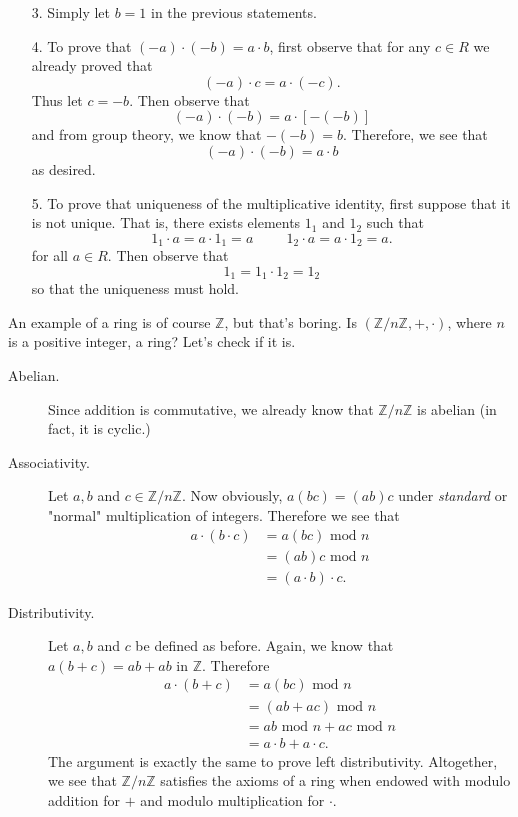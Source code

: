\documentclass[12pt,letterpaper]{algebra_book}
\newcommand{\ZZ}{\mathbb{Z}}
\theoremstyle{definition}
\begin{document}
\begin{prf}
\begin{itemize}
        \item[3.] Simply let $b = 1$ in the previous statements. 
        \item[4.] To prove that $(-a) \cdot (-b) = a \cdot b$,
        first observe that for any $c \in  R$ we already proved
        that 
        \[
            (-a) \cdot c = a \cdot (-c).
        \]
        Thus let $c = -b$. Then observe that 
        \[
            (-a) \cdot (-b) = a \cdot [-(-b)]
        \]
        and from group theory, we know that $-(-b) = b$.
        Therefore, we see that 
        \[
            (-a) \cdot (-b) = a \cdot b
        \]
        as desired. 

        \item[5.] To prove that uniqueness of the multiplicative
        identity, first suppose that it is not unique. That is,
        there exists elements $1_1$ and $1_2$ such that 
        \[
            1_1 \cdot a = a \cdot 1_1 = a \hspace{1cm}   1_2 \cdot a = a \cdot 1_2 = a.
        \]
        for all $a \in R$. Then observe that 
        \[
            1_1 = 1_1 \cdot 1_2 = 1_2
        \]
        so that the uniqueness must hold.
        
            
    \end{itemize}
\end{prf}
\textcolor{NavyBlue}{An example of a ring is of course $\mathbb{Z}$, but that's boring. 
Is $(\mathbb{Z}/n\mathbb{Z}, + , \cdot)$, where $n$ is a positive
integer, a ring? Let's check if it is. }
\begin{description}
    \item[Abelian.] Since addition is commutative, we already know
    that $\mathbb{Z}/n\mathbb{Z}$ is abelian (in fact, it is
    cyclic.)
    
    \item[Associativity.] Let $a, b$ and $c \in \ZZ/n\ZZ$. Now
    obviously, $a(bc) = (ab)c$ under \textit{standard} or "normal"
    multiplication of integers. Therefore we see that   
    \begin{align*}
        a\cdot(b \cdot c) &= a(bc) \mbox{ mod } n \\
        & = (ab)c \mbox{ mod }n \\
        & =(a \cdot b ) \cdot c.
    \end{align*}

    \item[Distributivity.] Let $a, b$ and $c$ be defined as before.
    Again, we know that $a(b + c) = ab + ab$ in $\mathbb{Z}$.
    Therefore 
    \begin{align*}
        a\cdot(b + c) &= a(bc) \mbox{ mod } n \\
        & = (ab + ac) \mbox{ mod }n \\
        & = ab \mbox{ mod }n + ac \mbox{ mod }n\\
        & = a \cdot b + a \cdot c.
    \end{align*}
    The argument is exactly the same to prove left distributivity.
    Altogether, we see that $\ZZ/n\ZZ$ satisfies the axioms of a
    ring when endowed with modulo addition for $+$ and modulo
    multiplication for $\cdot$. 
\end{description}
\end{document}
